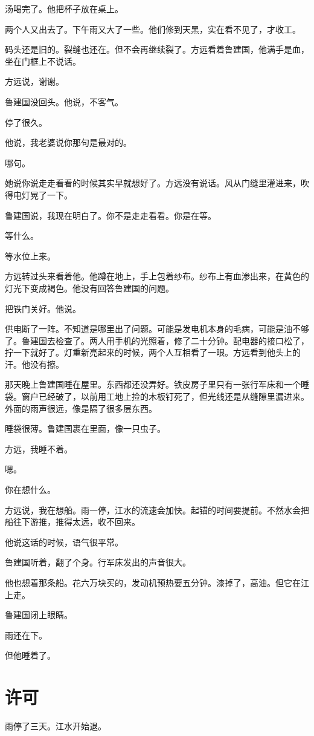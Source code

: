 \documentclass[UTF8,a5paper,11pt,openany]{ctexbook}
\begin{document}
汤喝完了。他把杯子放在桌上。

两个人又出去了。下午雨又大了一些。他们修到天黑，实在看不见了，才收工。

码头还是旧的。裂缝也还在。但不会再继续裂了。方远看着鲁建国，他满手是血，坐在门框上不说话。

方远说，谢谢。

鲁建国没回头。他说，不客气。

停了很久。

他说，我老婆说你那句是最对的。

哪句。

她说你说走走看看的时候其实早就想好了。方远没有说话。风从门缝里灌进来，吹得电灯晃了一下。

鲁建国说，我现在明白了。你不是走走看看。你是在等。

等什么。

等水位上来。

方远转过头来看着他。他蹲在地上，手上包着纱布。纱布上有血渗出来，在黄色的灯光下变成褐色。他没有回答鲁建国的问题。

把铁门关好。他说。

供电断了一阵。不知道是哪里出了问题。可能是发电机本身的毛病，可能是油不够了。鲁建国去检查了。两人用手机的光照着，修了二十分钟。配电器的接口松了，拧一下就好了。灯重新亮起来的时候，两个人互相看了一眼。方远看到他头上的汗。他没有擦。

那天晚上鲁建国睡在屋里。东西都还没弄好。铁皮房子里只有一张行军床和一个睡袋。窗户已经破了，以前用工地上捡的木板钉死了，但光线还是从缝隙里漏进来。外面的雨声很远，像是隔了很多层东西。

睡袋很薄。鲁建国裹在里面，像一只虫子。

方远，我睡不着。

嗯。

你在想什么。

方远说，我在想船。雨一停，江水的流速会加快。起锚的时间要提前。不然水会把船往下游推，推得太远，收不回来。

他说这话的时候，语气很平常。

鲁建国听着，翻了个身。行军床发出的声音很大。

他也想着那条船。花六万块买的，发动机预热要五分钟。漆掉了，高油。但它在江上走。

鲁建国闭上眼睛。

雨还在下。

但他睡着了。

\clearpage

\chapter{许可}
\indent
雨停了三天。江水开始退。
\end{document}
